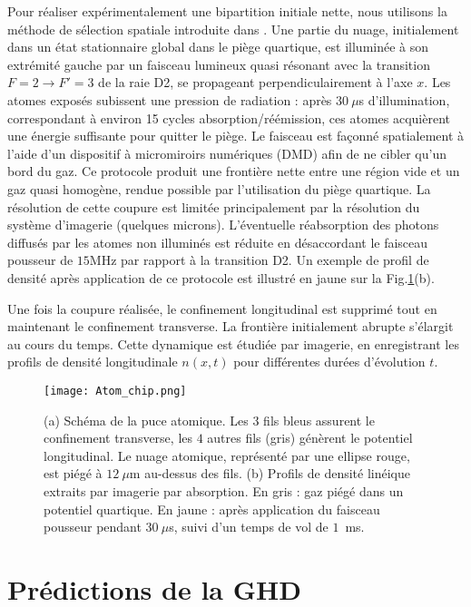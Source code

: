 Pour réaliser expérimentalement une bipartition initiale nette, nous utilisons la méthode de sélection spatiale introduite dans \cite{PhysRevLett.133.113402}. Une partie du nuage, initialement dans un état stationnaire global dans le piège quartique, est illuminée à son extrémité gauche par un faisceau lumineux quasi résonant avec la transition $F=2 \rightarrow F'=3$ de la raie D2, se propageant perpendiculairement à l’axe $x$. Les atomes exposés subissent une pression de radiation : après $30~\mu$s d’illumination, correspondant à environ 15 cycles absorption/réémission, ces atomes acquièrent une énergie suffisante pour quitter le piège. Le faisceau est façonné spatialement à l’aide d’un dispositif à micromiroirs numériques (DMD) afin de ne cibler qu’un bord du gaz. Ce protocole produit une frontière nette entre une région vide et un gaz quasi homogène, rendue possible par l’utilisation du piège quartique. La résolution de cette coupure est limitée principalement par la résolution du système d’imagerie (quelques microns). L’éventuelle réabsorption des photons diffusés par les atomes non illuminés est réduite en désaccordant le faisceau pousseur de $15$MHz par rapport à la transition D2. Un exemple de profil de densité après application de ce protocole est illustré en jaune sur la Fig.\ref{fig:setup}(b).

Une fois la coupure réalisée, le confinement longitudinal est supprimé tout en maintenant le confinement transverse. La frontière initialement abrupte s’élargit au cours du temps. Cette dynamique est étudiée par imagerie, en enregistrant les profils de densité longitudinale $n(x,t)$ pour différentes durées d’évolution $t$.

\begin{figure}[!htb]
\centering
\texttt{[image: Atom\_chip.png]}
\caption{(a) Schéma de la puce atomique. Les $3$ fils bleus assurent le confinement transverse, les $4$ autres fils (gris) génèrent le potentiel longitudinal. Le nuage atomique, représenté par une ellipse rouge, est piégé à $12~\mu$m au-dessus des fils. (b) Profils de densité linéique extraits par imagerie par absorption. En gris : gaz piégé dans un potentiel quartique. En jaune : après application du faisceau pousseur pendant $30~\mu$s, suivi d’un temps de vol de $1$~ms.}
\label{fig:setup}
\end{figure}

\section{Prédictions de la GHD}\label{sec.GHDpredictions}
\label{sec:ghd}

